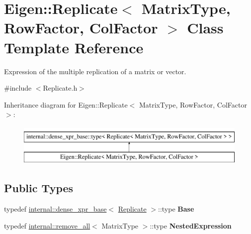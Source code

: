 \hypertarget{class_eigen_1_1_replicate}{}\section{Eigen\+::Replicate$<$ Matrix\+Type, Row\+Factor, Col\+Factor $>$ Class Template Reference}
\label{class_eigen_1_1_replicate}


Expression of the multiple replication of a matrix or vector.  




{\ttfamily \#include $<$Replicate.\+h$>$}

Inheritance diagram for Eigen\+::Replicate$<$ Matrix\+Type, Row\+Factor, Col\+Factor $>$\+:\begin{figure}[H]
\begin{center}
\leavevmode
\includegraphics[height=2.000000cm]{class_eigen_1_1_replicate}
\end{center}
\end{figure}
\subsection*{Public Types}
\begin{DoxyCompactItemize}
\item 
\mbox{\label{class_eigen_1_1_replicate_a5725bae5b2e3a85a37403feed2b8161d}} 
typedef \mbox{\hyperlink{struct_eigen_1_1internal_1_1dense__xpr__base}{internal\+::dense\+\_\+xpr\+\_\+base}}$<$ \mbox{\hyperlink{class_eigen_1_1_replicate}{Replicate}} $>$\+::type {\bfseries Base}
\item 
\mbox{\label{class_eigen_1_1_replicate_a4cc986623572d699119c3bcca6a12c69}} 
typedef \mbox{\hyperlink{struct_eigen_1_1internal_1_1remove__all}{internal\+::remove\+\_\+all}}$<$ Matrix\+Type $>$\+::type {\bfseries Nested\+Expression}
\end{DoxyCompactItemize}
